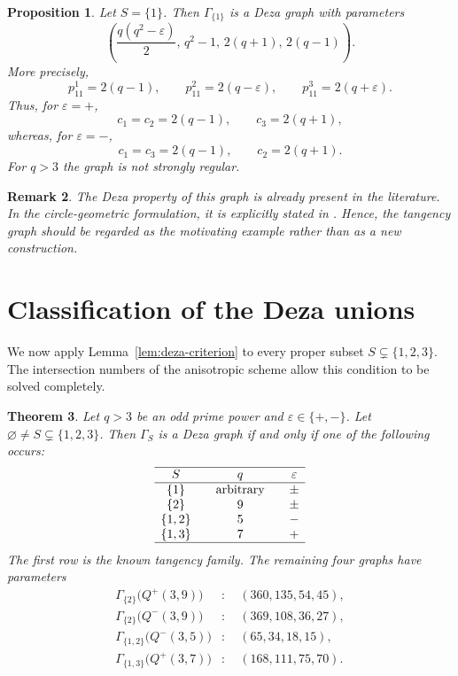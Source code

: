 \documentclass{article}
\theoremstyle{plain}
\newtheorem{thm}{Theorem}[section]
\newtheorem{prop}[thm]{Proposition}
\newtheorem{rem}[thm]{Remark}
\begin{document}
\begin{prop}\label{prop:tangent}
Let $S=\{1\}$. Then $\Gamma_{\{1\}}$ is a Deza graph with parameters
\[
 \left(
 \frac{q(q^2-\varepsilon)}2,\,
 q^2-1,\,
 2(q+1),\,
 2(q-1)
 \right).
\]
More precisely,
\[
 p_{11}^{1}=2(q-1),\qquad
 p_{11}^{2}=2(q-\varepsilon),\qquad
 p_{11}^{3}=2(q+\varepsilon).
\]
Thus, for $\varepsilon=+$,
\[
 c_1=c_2=2(q-1),\qquad c_3=2(q+1),
\]
whereas, for $\varepsilon=-$,
\[
 c_1=c_3=2(q-1),\qquad c_2=2(q+1).
\]
For $q>3$ the graph is not strongly regular.
\end{prop}

\begin{rem}
The Deza property of this graph is already present in the literature. In the circle-geometric formulation, it is explicitly stated in \cite[Lemma~4.6]{Adriaensen2022}. Hence, the tangency graph should be regarded as the motivating example rather than as a new construction.
\end{rem}

\section{Classification of the Deza unions}

We now apply Lemma~\ref{lem:deza-criterion} to every proper subset $S\subsetneq\{1,2,3\}$. The intersection numbers of the anisotropic scheme allow this condition to be solved completely.
\begin{thm}\label{thm:classification}
Let $q>3$ be an odd prime power and
$\varepsilon\in\{+,-\}$.  Let
$\varnothing\neq S\subsetneq\{1,2,3\}$.
Then $\Gamma_S$ is a Deza graph if and only if one of the following occurs:
\[
\begin{array}{c@{\qquad}c@{\qquad}c}
\hline
S & q & \varepsilon\\
\hline
\{1\}   & \text{arbitrary} & \pm\\
\{2\}   & 9                & \pm\\
\{1,2\} & 5                & -\\
\{1,3\} & 7                & +\\
\hline
\end{array}
\]
The first row is the known tangency family.  The remaining four graphs have parameters
\[
\begin{aligned}
 \Gamma_{\{2\}}\bigl(Q^+(3,9)\bigr)
   &:\quad (360,135,54,45),\\
 \Gamma_{\{2\}}\bigl(Q^-(3,9)\bigr)
   &:\quad (369,108,36,27),\\
 \Gamma_{\{1,2\}}\bigl(Q^-(3,5)\bigr)
   &:\quad (65,34,18,15),\\
 \Gamma_{\{1,3\}}\bigl(Q^+(3,7)\bigr)
   &:\quad (168,111,75,70).
\end{aligned}
\]
\end{thm}
\end{document}
